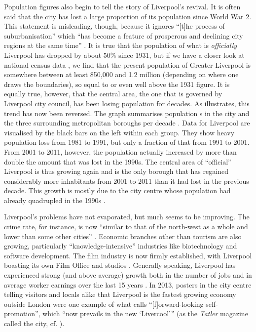 \newpage 	
Population figures also begin to tell the story of Liverpool's revival.
It is often said that the city has lost a large proportion of its population since World War 2.
This statement is misleading, though, because it ignores ``[t]he process of suburbanisation'' which ``has become a feature of prosperous and declining city regions at the same time'' \citep[21]{fraser2003}.
It is true that the population of what is \emph{officially} Liverpool has dropped by about 50\% since 1931, but if we have a closer look at national census data \parencite{nomis}, we find that the present population of Greater Liverpool is somewhere between at least 850,000 and 1.2 million (depending on where one draws the boundaries), so equal to or even well above the 1931 figure.
It is equally true, however, that the central area, the one that is governed by Liverpool city council, has been losing population for decades.
As  illustrates, this trend has now been reversed.
The graph summarises population s in the city and the three surrounding metropolitan boroughs per decade \parencite{nomis}.
Data for Liverpool are visualised by the black bars on the left within each group.
They show heavy population loss from 1981 to 1991, but only a fraction of that from 1991 to 2001.
From 2001 to 2011, however, the population actually increased by more than double the amount that was lost in the 1990s.
The central area of ``official'' Liverpool is thus growing again and is the only borough that has regained considerably more inhabitants from 2001 to 2011 than it had lost in the previous decade.
This growth is mostly due to the city centre whose population had already quadrupled in the 1990s \citep[cf.][xix]{belchem2006c}.

Liverpool's problems have not evaporated, but much seems to be improving.
The crime rate, for instance, is now ``similar to that of the north-west as a whole and lower than some other cities''  \citep[235]{pooley2006}.
Economic branches other than tourism are also growing, particularly ``knowledge-intensive'' industries {like } biotechnology \citep[cf.][204]{percy2003} and software development.
The film industry is now firmly established, with Liverpool boasting its own Film Office and studios \parencite[cf.][478--480]{murden2006}.
Generally speaking, Liverpool has experienced strong (and above average) growth both in the number of jobs and in average worker earnings over the last 15 years \parencite[cf.][4]{lcc2016}.
In 2013, posters in the city centre telling visitors and locals alike that Liverpool is the fastest growing economy outside London were one example of what \citet[54]{belchem2006a} calls ``[f]orward-looking self-promotion'', which ``now prevails in the new `Livercool'{}'' (as the \emph{Tatler} magazine called the city, cf. \citealt[484]{murden2006}).

